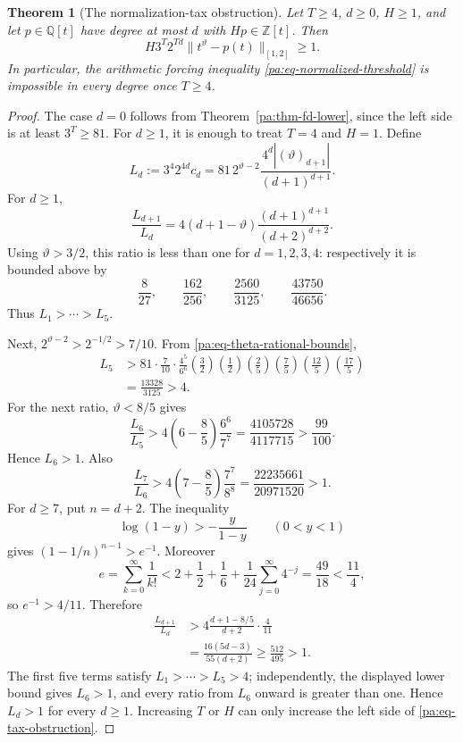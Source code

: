 \documentclass[11pt,oneside]{article}
\newtheorem{theorem}{Theorem}[section]
\theoremstyle{definition}
\theoremstyle{remark}
\newcommand{\Z}{\mathbb Z}
\newcommand{\Q}{\mathbb Q}
\newcommand{\thetaq}{\vartheta}
\newcommand{\fall}[2]{\left(#1\right)_{\!\underline{#2}}}
\begin{document}
\begin{theorem}[The normalization-tax obstruction]
\label{pa:thm-normalization-tax}
Let \(T\ge4\), \(d\ge0\), \(H\ge1\), and let \(p\in\Q[t]\) have degree at most \(d\) with
\(Hp\in\Z[t]\).  Then
\begin{equation}
 H3^T2^{Td}
 \bigl\|t^{\thetaq}-p(t)\bigr\|_{[1,2]}
 \ge1.
 \label{pa:eq-tax-obstruction}
\end{equation}
In particular, the arithmetic forcing inequality
\eqref{pa:eq-normalized-threshold} is impossible in every degree once \(T\ge4\).
\end{theorem}

\begin{proof}
The case \(d=0\) follows from Theorem~\ref{pa:thm-fd-lower}, since the left side is at least
\(3^T\ge81\).  For \(d\ge1\), it is enough to treat \(T=4\) and \(H=1\).  Define
\begin{equation}
 L_d:=3^4 2^{4d}c_d
 =81\,2^{\thetaq-2}
 \frac{4^d|\fall{\thetaq}{d+1}|}{(d+1)^{d+1}}.
 \label{pa:eq-Ld}
\end{equation}
For \(d\ge1\),
\begin{equation}
 \frac{L_{d+1}}{L_d}
 =4(d+1-\thetaq)
 \frac{(d+1)^{d+1}}{(d+2)^{d+2}}.
 \label{pa:eq-L-ratio}
\end{equation}
Using \(\thetaq>3/2\), this ratio is less than one for \(d=1,2,3,4\): respectively it is
bounded above by
\[
 \frac8{27},\qquad
 \frac{162}{256},\qquad
 \frac{2560}{3125},\qquad
 \frac{43750}{46656}.
\]
Thus \(L_1>\cdots>L_5\).

Next, \(2^{\thetaq-2}>2^{-1/2}>7/10\).  From
\eqref{pa:eq-theta-rational-bounds},
\begin{align*}
 L_5
 &>81\cdot\frac7{10}\cdot\frac{4^5}{6^6}
   \left(\frac32\right)\left(\frac12\right)
   \left(\frac25\right)\left(\frac75\right)
   \left(\frac{12}{5}\right)\left(\frac{17}{5}\right)\\
 &=\frac{13328}{3125}>4.
\end{align*}
For the next ratio, \(\thetaq<8/5\) gives
\[
 \frac{L_6}{L_5}
 >4\left(6-\frac85\right)\frac{6^6}{7^7}
 =\frac{4105728}{4117715}>\frac{99}{100}.
\]
Hence \(L_6>1\).  Also
\[
 \frac{L_7}{L_6}
 >4\left(7-\frac85\right)\frac{7^7}{8^8}
 =\frac{22235661}{20971520}>1.
\]
For \(d\ge7\), put \(n=d+2\).  The inequality
\[
 \log(1-y)>-\frac{y}{1-y}\qquad(0<y<1)
\]
gives \((1-1/n)^{n-1}>e^{-1}\).  Moreover
\[
 e=\sum_{k=0}^{\infty}\frac1{k!}
 <2+\frac12+\frac16+\frac1{24}\sum_{j=0}^{\infty}4^{-j}
 =\frac{49}{18}<\frac{11}{4},
\]
so \(e^{-1}>4/11\).  Therefore
\begin{align*}
 \frac{L_{d+1}}{L_d}
 &>4\frac{d+1-8/5}{d+2}\cdot\frac4{11}\\
 &=\frac{16(5d-3)}{55(d+2)}
 \ge\frac{512}{495}>1.
\end{align*}
The first five terms satisfy \(L_1>\cdots>L_5>4\); independently, the displayed lower
bound gives \(L_6>1\), and every ratio from \(L_6\) onward is greater than one.  Hence
\(L_d>1\) for every \(d\ge1\).  Increasing \(T\) or \(H\) can only increase the left side
of \eqref{pa:eq-tax-obstruction}.
\end{proof}
\end{document}
